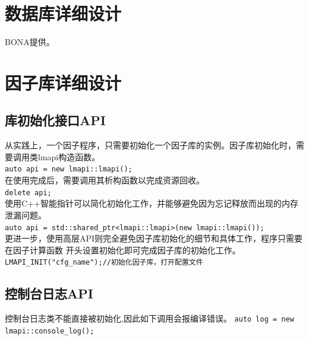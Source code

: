     \chapter{数据库详细设计}
    \LARGE{BONA提供}\normalsize。
    \chapter{因子库详细设计}



\section{库初始化接口API}

从实践上，一个因子程序，只需要初始化一个因子库的实例。因子库初始化时，需要调用类lmapi构造函数。\\

\lstinline!auto api = new lmapi::lmapi();!\\

在使用完成后，需要调用其析构函数以完成资源回收。\\

\lstinline!delete api;!\\

使用C++智能指针可以简化初始化工作，并能够避免因为忘记释放而出现的内存泄漏问题。\\

\lstinline!auto api = std::shared_ptr<lmapi::lmapi>(new lmapi::lmapi());!\\

更进一步，使用高层API则完全避免因子库初始化的细节和具体工作，程序只需要在因子计算函数
开头设置初始化即可完成因子库的初始化工作。\\

\lstinline!LMAPI_INIT("cfg_name");//初始化因子库，打开配置文件!

        \section{控制台日志API}
        控制台日志类不能直接被初始化,因此如下调用会报编译错误。
\lstinline!auto log = new lmapi::console_log();!


